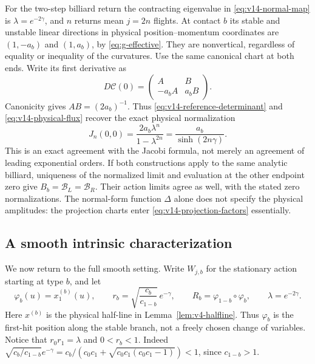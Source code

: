 For the two-step billiard return the contracting eigenvalue in
\eqref{eq:v14-normal-map} is $\lambda=e^{-2\gamma}$, and $n$
returns mean $j=2n$ flights. At contact $b$ its stable and unstable
linear directions in physical position--momentum coordinates are
$(1,-a_b)$ and $(1,a_b)$, by \eqref{eq:g-effective}. They are
nonvertical, regardless of equality or inequality of the curvatures.
Use the same canonical chart at both ends. Write its first derivative
as
\[
 D\mathcal C(0)=
 \begin{pmatrix}A&B\\-a_bA&a_bB\end{pmatrix}.
\]
Canonicity gives $AB=(2a_b)^{-1}$. Thus
\eqref{eq:v14-reference-determinant} and \eqref{eq:v14-physical-flux}
recover the exact physical normalization
\begin{equation}\label{eq:v14-csch-normalization}
 J_n(0,0)=\frac{2a_b\lambda^n}{1-\lambda^{2n}}
                        =\frac{a_b}{\sinh(2n\gamma)}.
\end{equation}
This is an exact agreement with the Jacobi formula, not merely an
agreement of leading exponential orders. If both constructions apply
to the same analytic billiard, uniqueness of the normalized limit and
evaluation at the other endpoint zero give
$B_b=\mathcal B_L=\mathcal B_R$. Their action limits agree as well,
with the stated zero normalizations. The normal-form function $\Delta$
alone does not specify the physical amplitudes: the projection charts
enter \eqref{eq:v14-projection-factors} essentially.

\subsection{A smooth intrinsic characterization}
We now return to the full smooth setting. Write $W_{j,b}$ for the
stationary action starting at type $b$, and let
\[
 \varphi_b(u)=x_1^{(b)}(u),\qquad
 r_b=\sqrt{\frac{c_b}{c_{1-b}}}\,e^{-\gamma},\qquad
 R_b=\varphi_{1-b}\circ\varphi_b,\qquad
 \lambda=e^{-2\gamma}.
\]
Here $x^{(b)}$ is the physical half-line in
Lemma~\ref{lem:v4-halfline}. Thus $\varphi_b$ is the first-hit
position along the stable branch, not a freely chosen change of
variables. Notice that $r_0r_1=\lambda$ and $0<r_b<1$.
Indeed $\sqrt{c_b/c_{1-b}}e^{-\gamma}
=c_b/(c_0c_1+\sqrt{c_0c_1(c_0c_1-1)})<1$, since $c_{1-b}>1$.

